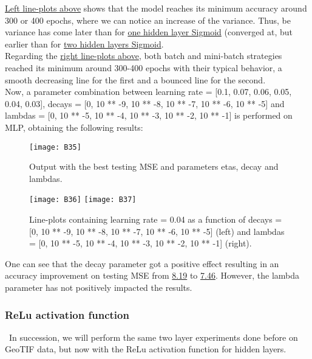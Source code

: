 \hyperref[fig:B22]{Left line-plots above} shows that the model reaches its minimum accuracy around 300 or 400 epochs, where we can notice an increase of the variance. Thus, be variance has come later than for \hyperref[fig:B5]{one hidden layer Sigmoid} (converged at, but earlier than for  \hyperref[fig:B14]{two hidden layers Sigmoid}.\\

Regarding the \hyperref[fig:B22]{right line-plots above}, both batch and mini-batch strategies reached its minimum around 300-400 epochs with their typical behavior, a smooth decreasing line for the first and a bounced line for the second.\\

Now, a parameter combination between learning rate = [0.1, 0.07, 0.06, 0.05, 0.04, 0.03], decays = [0, 10 ** -9, 10 ** -8, 10 ** -7, 10 ** -6, 10 ** -5] and lambdas = [0, 10 ** -5, 10 ** -4, 10 ** -3, 10 ** -2, 10 ** -1] is performed on MLP, obtaining the following results:

\begin{figure}[H]
\label{fig:B23}
\centering
\texttt{[image: B35]}
\caption{Output with the best testing MSE and parameters etas, decay and lambdas.}
\end{figure}

\begin{figure}[H]
\label{fig:B24}
\centering
\texttt{[image: B36]}
\texttt{[image: B37]}
\caption{Line-plots containing learning rate = 0.04 as a function of decays = [0, 10 ** -9, 10 ** -8, 10 ** -7, 10 ** -6, 10 ** -5] (left) and lambdas = [0, 10 ** -5, 10 ** -4, 10 ** -3, 10 ** -2, 10 ** -1] (right).}
\end{figure}

One can see that the decay parameter got a positive effect resulting in an accuracy improvement on testing MSE from \hyperref[fig:B18]{8.19} to \hyperref[fig:B23]{7.46}. However, the lambda parameter has not positively impacted the results.

\subsubsection{ReLu activation function}
\label{chap:ReLu activation function}

\quad \, In succession, we will perform the same two layer experiments done before on GeoTIF data, but now with the ReLu activation function for hidden layers.\\


